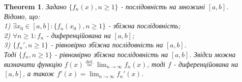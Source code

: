 \documentclass[a4paper, 10pt]{article}
\def\huge{\displaystyle}
\theoremstyle{theoremdd}
\newtheorem{theorem}{Theorem}[subsection]
\theoremstyle{theoremdd}
\theoremstyle{theoremdd}
\theoremstyle{theoremdd}
\theoremstyle{theoremdd}
\theoremstyle{theoremdd}
\theoremstyle{theoremdd}
\theoremstyle{theoremdd}
\theoremstyle{theoremdd}
\begin{document}
\begin{theorem}
Задано $\{f_n(x), n \geq 1\}$ - послідовність на множині $[a,b]$. Відомо, що:\\
1) $\exists x_0 \in [a,b]: \{f_n(x_0), n \geq 1\}$ - збіжна послідовність;\\
2) $\forall n \geq 1: f_n$ - диференційована на $[a,b]$;\\
3) $\{f_n', n \geq 1\}$ - рівновірно збіжна послідовність на $[a,b]$. \\

Тоді $\{f_n, n \geq 1\}$ - рівномірно збіжна послідовність на $[a,b]$. Звідси можна визначити функцію $f(x) \overset{\text{def.}}{=} \displaystyle\lim_{n \to \infty} f_n(x)$, тоді $f$ -  диференційована на $[a,b]$, а також $f'(x) = \displaystyle\lim_{n \to \infty} f_n'(x)$.
\end{theorem}
\end{document}
